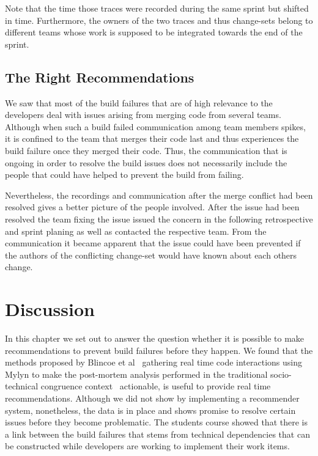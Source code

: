 Note that the time those traces were recorded during the same sprint but shifted in time.
Furthermore, the owners of the two traces and thus change-sets belong to different teams whose work is supposed to be integrated towards the end of the sprint.

\subsection{The Right Recommendations}
We saw that most of the build failures that are of high relevance to the developers deal with issues arising from merging code from several teams.
Although when such a build failed communication among team members spikes, it is confined to the team that merges their code last and thus experiences the build failure once they merged their code.
Thus, the communication that is ongoing in order to resolve the build issues does not necessarily include the people that could have helped to prevent the build from failing.

Nevertheless, the recordings and communication after the merge conflict had been resolved gives a better picture of the people involved.
After the issue had been resolved the team fixing the issue issued the concern in the following retrospective and sprint planing as well as contacted the respective team.
From the communication it became apparent that the issue could have been prevented if the authors of the conflicting change-set would have known about each others change.

\section{Discussion}
In this chapter we set out to answer the question whether it is possible to make recommendations to prevent build failures before they happen.
We found that the methods proposed by Blincoe et al~\cite{} gathering real time code interactions using Mylyn to make the post-mortem analysis performed in the traditional socio-technical congruence context~\cite{} actionable, is useful to provide real time recommendations.
Although we did not show by implementing a recommender system, nonetheless, the data is in place and shows promise to resolve certain issues before they become problematic.
The students course showed that there is a link between the build failures that stems from technical dependencies that can be constructed while developers are working to implement their work items.

